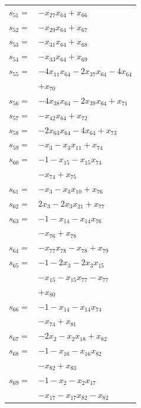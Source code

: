 \begin{longtable}{@{}r@{\;}l@{}}
\(s_{51}=\) & \(\displaystyle -x_{27}x_{64} +x_{66}\) \\[3pt]
\(s_{52}=\) & \(\displaystyle -x_{29}x_{64} +x_{67}\) \\[3pt]
\(s_{53}=\) & \(\displaystyle -x_{31}x_{64} +x_{68}\) \\[3pt]
\(s_{54}=\) & \(\displaystyle -x_{33}x_{64} +x_{69}\) \\[3pt]
\(s_{55}=\) & \(\displaystyle -4x_{11}x_{64} -2x_{37}x_{64} -4x_{64}\) \\
 & \(\displaystyle +x_{70}\) \\[3pt]
\(s_{56}=\) & \(\displaystyle -4x_{38}x_{64} -2x_{39}x_{64} +x_{71}\) \\[3pt]
\(s_{57}=\) & \(\displaystyle -x_{42}x_{64} +x_{72}\) \\[3pt]
\(s_{58}=\) & \(\displaystyle -2x_{63}x_{64} -4x_{64} +x_{73}\) \\[3pt]
\(s_{59}=\) & \(\displaystyle -x_{3} -x_{3}x_{11} +x_{74}\) \\[3pt]
\(s_{60}=\) & \(\displaystyle -1 -x_{15} -x_{15}x_{74}\) \\
 & \(\displaystyle -x_{74} +x_{75}\) \\[3pt]
\(s_{61}=\) & \(\displaystyle -x_{3} -x_{3}x_{10} +x_{76}\) \\[3pt]
\(s_{62}=\) & \(\displaystyle 2x_{3} -2x_{3}x_{21} +x_{77}\) \\[3pt]
\(s_{63}=\) & \(\displaystyle -1 -x_{14} -x_{14}x_{76}\) \\
 & \(\displaystyle -x_{76} +x_{78}\) \\[3pt]
\(s_{64}=\) & \(\displaystyle -x_{77}x_{78} -x_{78} +x_{79}\) \\[3pt]
\(s_{65}=\) & \(\displaystyle -1 -2x_{3} -2x_{3}x_{15}\) \\
 & \(\displaystyle -x_{15} -x_{15}x_{77} -x_{77}\) \\
 & \(\displaystyle +x_{80}\) \\[3pt]
\(s_{66}=\) & \(\displaystyle -1 -x_{14} -x_{14}x_{74}\) \\
 & \(\displaystyle -x_{74} +x_{81}\) \\[3pt]
\(s_{67}=\) & \(\displaystyle -2x_{2} -x_{2}x_{18} +x_{82}\) \\[3pt]
\(s_{68}=\) & \(\displaystyle -1 -x_{16} -x_{16}x_{82}\) \\
 & \(\displaystyle -x_{82} +x_{83}\) \\[3pt]
\(s_{69}=\) & \(\displaystyle -1 -x_{2} -x_{2}x_{17}\) \\
 & \(\displaystyle -x_{17} -x_{17}x_{82} -x_{82}\) \\

\end{longtable}
